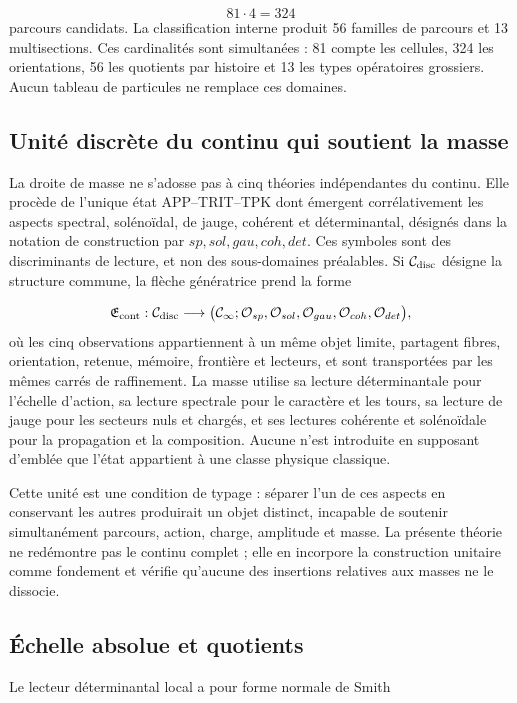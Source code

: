\[
81\cdot4=324
\]
parcours candidats. La classification interne produit 56 familles de parcours et 13 multisections. Ces cardinalités sont simultanées : 81 compte les cellules, 324 les orientations, 56 les quotients par histoire et 13 les types opératoires grossiers. Aucun tableau de particules ne remplace ces domaines.

\subsection{Unité discrète du continu qui soutient la masse}
La droite de masse ne s'adosse pas à cinq théories indépendantes du continu. Elle procède de l'unique état APP--TRIT--TPK dont émergent corrélativement les aspects spectral, solénoïdal, de jauge, cohérent et déterminantal, désignés dans la notation de construction par \(sp,sol,gau,coh,det\). Ces symboles sont des discriminants de lecture, et non des sous-domaines préalables. Si \(\mathcal C_{\rm disc}\) désigne la structure commune, la flèche génératrice prend la forme

\[
\mathfrak E_{\rm cont}:\mathcal C_{\rm disc}
\longrightarrow
\bigl(\mathcal C_\infty;
\mathcal O_{sp},\mathcal O_{sol},\mathcal O_{gau},
\mathcal O_{coh},\mathcal O_{det}\bigr),
\]
où les cinq observations appartiennent à un même objet limite, partagent fibres, orientation, retenue, mémoire, frontière et lecteurs, et sont transportées par les mêmes carrés de raffinement. La masse utilise sa lecture déterminantale pour l'échelle d'action, sa lecture spectrale pour le caractère et les tours, sa lecture de jauge pour les secteurs nuls et chargés, et ses lectures cohérente et solénoïdale pour la propagation et la composition. Aucune n'est introduite en supposant d'emblée que l'état appartient à une classe physique classique.

Cette unité est une condition de typage : séparer l'un de ces aspects en conservant les autres produirait un objet distinct, incapable de soutenir simultanément parcours, action, charge, amplitude et masse. La présente théorie ne redémontre pas le continu complet ; elle en incorpore la construction unitaire comme fondement et vérifie qu'aucune des insertions relatives aux masses ne le dissocie.

\subsection{Échelle absolue et quotients}
Le lecteur déterminantal local a pour forme normale de Smith

